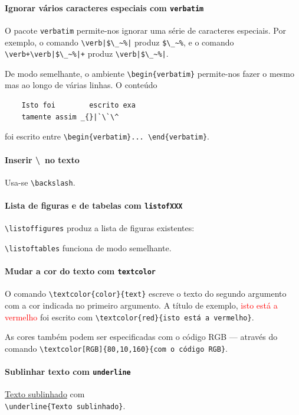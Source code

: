 \documentclass[11pt]{article}
\begin{document}
\paragraph{Ignorar vários caracteres especiais com \texttt{verbatim}}
O pacote \texttt{verbatim} permite-nos ignorar uma série de caracteres especiais.
Por exemplo, o comando \verb+\verb|$\_~%|+ produz \verb|$\_~%|, e o comando
\verb-\verb+\verb|$\_~%|+- produz \verb+\verb|$\_~%|+.

De modo semelhante, o ambiente \verb|\begin{verbatim}| permite-nos fazer o mesmo
mas ao longo de várias linhas. O conteúdo
\begin{verbatim}
    Isto foi        escrito exa
    tamente assim _{}|`\`\^
\end{verbatim}
foi escrito entre \verb|\begin{verbatim}... \end{verbatim}|.

\paragraph{Inserir \textbackslash~no texto}
Usa-se \verb|\backslash|.

\paragraph{Lista de figuras e de tabelas com \texttt{listofXXX}}
\verb|\listoffigures| produz a lista de figuras existentes:

\listoffigures

\verb|\listoftables| funciona de modo semelhante.

\paragraph{Mudar a cor do texto com \texttt{textcolor}}
O comando \verb|\textcolor{color}{text}| escreve o texto do segundo
argumento com a cor indicada no primeiro argumento.
A título de exemplo, \textcolor{red}{isto está a vermelho} foi escrito com
\verb|\textcolor{red}{isto está a vermelho}|.

As cores também podem ser especificadas
\textcolor[RGB]{80,10,160}{com o código RGB} --- através do comando
\verb|\textcolor[RGB]{80,10,160}{com o código RGB}|.

\paragraph{Sublinhar texto com \texttt{underline}}
\underline{Texto sublinhado} com \\
\verb|\underline{Texto sublinhado}|.
\end{document}
